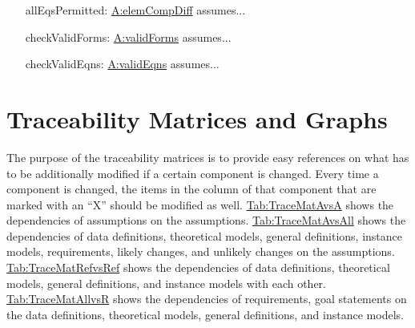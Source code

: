 \documentclass[12pt]{article}
\begin{document}
\begin{itemize}
\item[allEqsPermitted:\phantomsection\label{allEqsPermitted}]{\hyperref[elemCompDiff]{A:elemCompDiff} assumes...}
\item[checkValidForms:\phantomsection\label{checkValidForms}]{\hyperref[validForms]{A:validForms} assumes...}
\item[checkValidEqns:\phantomsection\label{checkValidEqns}]{\hyperref[validEqns]{A:validEqns} assumes...}
\end{itemize}
\section{Traceability Matrices and Graphs}
\label{Sec:TraceMatrices}
The purpose of the traceability matrices is to provide easy references on what has to be additionally modified if a certain component is changed. Every time a component is changed, the items in the column of that component that are marked with an ``X'' should be modified as well. \hyperref[Table:TraceMatAvsA]{Tab:TraceMatAvsA} shows the dependencies of assumptions on the assumptions. \hyperref[Table:TraceMatAvsAll]{Tab:TraceMatAvsAll} shows the dependencies of data definitions, theoretical models, general definitions, instance models, requirements, likely changes, and unlikely changes on the assumptions. \hyperref[Table:TraceMatRefvsRef]{Tab:TraceMatRefvsRef} shows the dependencies of data definitions, theoretical models, general definitions, and instance models with each other. \hyperref[Table:TraceMatAllvsR]{Tab:TraceMatAllvsR} shows the dependencies of requirements, goal statements on the data definitions, theoretical models, general definitions, and instance models.
\end{document}
